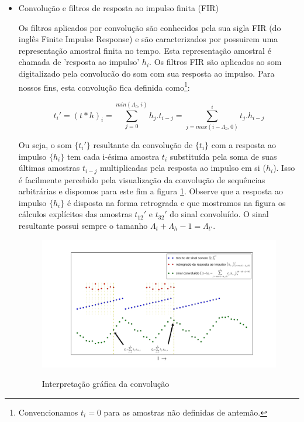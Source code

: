 \begin{itemize}

\item  Convolução e filtros de resposta ao impulso finita (FIR)

Os filtros aplicados por convolução são conhecidos
pela sua sigla FIR (do inglês Finite Impulse Response)
e são caracterizados por possuirem uma representação amostral
finita no tempo. Esta representação amostral é chamada
de 'resposta ao impulso' $h_i$. Os filtros FIR são aplicados ao som
digitalizado pela convolucão do som com sua 
resposta ao impulso. Para nossos fins, esta
convolução fica definida como\footnote{Convencionamos $t_i=0$ para as
amostras não definidas de antemão.}:

\begin{equation}
t_i'=(t*h)_i=\sum_{j=0}^{min(\Lambda_h,i)}h_{j} . t_{i-j}=\sum_{j=max(i-\Lambda_h,0)}^{i}t_j . h_{i-j}
\end{equation}

Ou seja, o som $\{t_i'\}$ resultante da convolução de $\{t_i\}$ com a resposta ao impulso $\{h_i\}$
tem cada i-ésima amostra $t_i$ substituída pela soma de suas últimas amostras $t_{i-j}$
multiplicadas pela resposta ao impulso em si ($h_i$). Isso é facilmente
percebido pela visualização da convolução de sequências arbitrárias e dispomos
para este fim a figura \ref{fig:conv}. Observe que a resposta ao impulso $\{h_i\}$
é disposta na forma retrograda e que mostramos na figura os cálculos explícitos
das amostras $t_{12}'$ e $t_{32}'$ do sinal convoluído. O sinal resultante possui
sempre o tamanho $\Lambda_t+\Lambda_h -1=\Lambda_{t'}$.

\begin{figure}[h!]
    \centering
    \caption{Interpretação gráfica da convolução}
        \includegraphics[width=\textwidth]{figuras/convolucao______}
        \label{fig:conv}
\end{figure}



\end{itemize}
